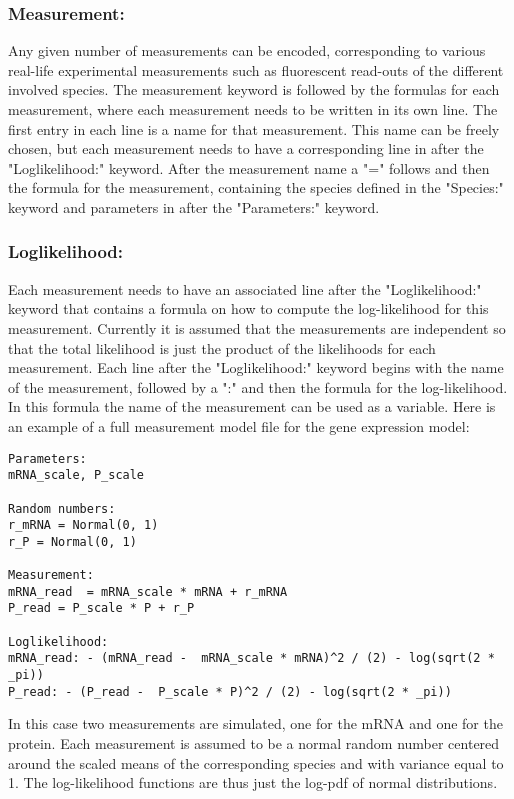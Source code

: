 \documentclass[11pt]{article} %
\begin{document}
\subsubsection{Measurement:}
Any given number of measurements can be encoded, corresponding to various real-life experimental measurements such as fluorescent read-outs of the different involved species. The measurement keyword is followed by the formulas for each measurement, where each measurement needs to be written in its own line. The first entry in each line is a name for that measurement. This name can be freely chosen, but each measurement needs to have a corresponding line in after the "Loglikelihood:" keyword. After the measurement name a "=" follows and then the formula for the measurement, containing the species defined in the "Species:" keyword and parameters in after the "Parameters:" keyword. 

\subsubsection{Loglikelihood:}
Each measurement needs to have an associated line after the "Loglikelihood:" keyword that contains a formula on how to compute the log-likelihood for this measurement. Currently it is assumed that the measurements are independent so that the total likelihood is just the product of the likelihoods for each measurement. Each line after the "Loglikelihood:" keyword begins with the name of the measurement, followed by a ":" and then the formula for the log-likelihood. In this formula the name of the measurement can be used as a variable. 
Here is an example of a full measurement model file for the gene expression model:

\begin{verbatim}
Parameters:
mRNA_scale, P_scale

Random numbers:
r_mRNA = Normal(0, 1)
r_P = Normal(0, 1)

Measurement:
mRNA_read  = mRNA_scale * mRNA + r_mRNA
P_read = P_scale * P + r_P

Loglikelihood:
mRNA_read: - (mRNA_read -  mRNA_scale * mRNA)^2 / (2) - log(sqrt(2 * _pi))
P_read: - (P_read -  P_scale * P)^2 / (2) - log(sqrt(2 * _pi))

\end{verbatim}
In this case two measurements are simulated, one for the mRNA and one for the protein. Each measurement is assumed to be a normal random number centered around the scaled means of the corresponding species and with variance equal to 1. The log-likelihood functions are thus just the log-pdf of normal distributions.
\end{document}
